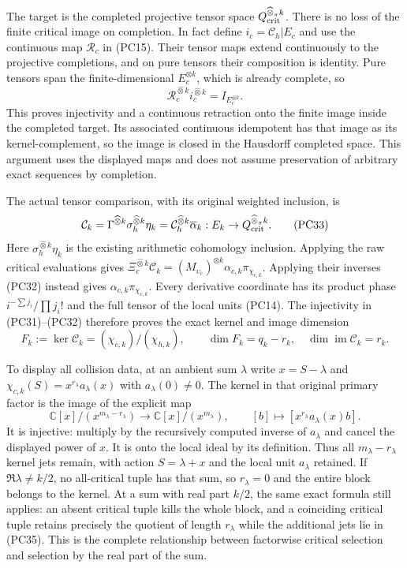 The target is the completed projective tensor space
$Q_{\rm crit}^{\widehat\otimes_\pi k}$.  There is no loss of the
finite critical image on completion.  In fact define
$i_c=\mathcal C_h|E_c$ and use the continuous map $\mathcal R_c$
in (PC15).  Their tensor maps extend continuously to the projective
completions, and on pure tensors their composition is identity.
Pure tensors span the finite-dimensional $E_c^{\otimes k}$, which
is already complete, so
\[
 \mathcal R_c^{\widehat\otimes k}
             i_c^{\widehat\otimes k}=I_{E_c^{\otimes k}}.
 \tag{PC32}
\]
This proves injectivity and a continuous retraction onto the finite
image inside the completed target.  Its associated continuous
idempotent has that image as its kernel-complement, so the image is
closed in the Hausdorff completed space.  This argument uses the
displayed maps and does not assume preservation of arbitrary exact
sequences by completion.

The actual tensor comparison, with its original weighted inclusion, is
\[
 \mathcal C_k=
    \Gamma^{\widehat\otimes k}\sigma_h^{\widehat\otimes k}\eta_k
    =\mathcal C_h^{\widehat\otimes k}\overline\alpha_k:
        E_k\to Q_{\rm crit}^{\widehat\otimes_\pi k}.
 \tag{PC33}
\]
Here $\sigma_h^{\widehat\otimes k}\eta_k$ is the existing arithmetic
cohomology inclusion.  Applying the raw critical evaluations gives
$\Xi_c^{\widehat\otimes k}\mathcal C_k=
(M_{\upsilon_c})^{\otimes k}\alpha_{c,k}\pi_{\chi_{c,k}}$.
Applying their inverses (PC32) instead gives
$\alpha_{c,k}\pi_{\chi_{c,k}}$.  Every derivative coordinate has
its product phase $i^{-\sum j_i}/\prod j_i!$ and the full tensor
of the local units (PC14).  The injectivity in (PC31)--(PC32)
therefore proves the exact kernel and image dimension
\[
 \boxed{F_k:=\ker\mathcal C_k=(\chi_{c,k})/(\chi_{h,k}),
       \qquad\dim F_k=q_k-r_k,\quad
       \dim\operatorname{im}\mathcal C_k=r_k.}
 \tag{PC34}
\]

To display all collision data, at an ambient sum $\lambda$ write
$x=S-\lambda$ and
$\chi_{c,k}(S)=x^{r_\lambda}a_\lambda(x)$ with
$a_\lambda(0)\ne0$.  The kernel in that original primary factor is
the image of the explicit map
\[
 \mathbb C[x]/(x^{m_\lambda-r_\lambda})
  \longrightarrow\mathbb C[x]/(x^{m_\lambda}),\qquad
 [b]\longmapsto[x^{r_\lambda}a_\lambda(x)b].
 \tag{PC35}
\]
It is injective: multiply by the recursively computed inverse of
$a_\lambda$ and cancel the displayed power of $x$.
It is onto the local ideal by its definition.  Thus all
$m_\lambda-r_\lambda$ kernel jets remain, with action
$S=\lambda+x$ and the local unit $a_\lambda$ retained.
If $\Re\lambda\ne k/2$, no all-critical tuple has that sum,
so $r_\lambda=0$ and the entire block belongs to the kernel.
At a sum with real part $k/2$, the same exact formula still
applies: an absent critical tuple kills the whole block, and a
coinciding critical tuple retains precisely the quotient of length
$r_\lambda$ while the additional jets lie in (PC35).
This is the complete relationship between factorwise critical
selection and selection by the real part of the sum.

